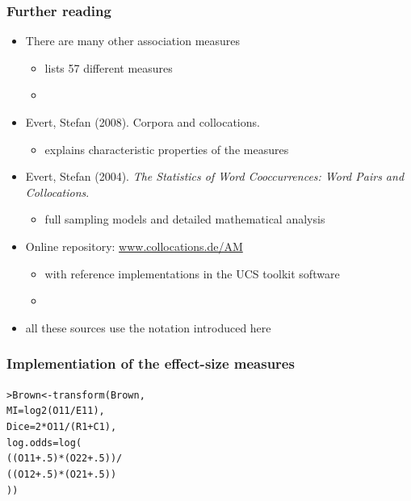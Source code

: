 \documentclass[t]{beamer} %
\begin{document}
\begin{frame}
  \frametitle{Further reading}

  \begin{itemize}
  \item There are many other association measures
    \begin{itemize}
    \item \citet{Pecina:05} lists 57 different measures
    \item[]
    \end{itemize}
  \item Evert, Stefan (2008). Corpora and collocations.\\
    \nocite{Evert:08}
    \begin{itemize}
    \item explains characteristic properties of the measures
    \end{itemize}
  \item Evert, Stefan (2004). \emph{The Statistics of Word Cooccurrences: Word
      Pairs and Collocations}.\\
    \nocite{Evert:04phd}
    \begin{itemize}
    \item full sampling models and detailed mathematical analysis
    \end{itemize}
  \item Online repository: \h{\url{www.collocations.de/AM}}
    \begin{itemize}
    \item with reference implementations in the UCS toolkit software
    \item[]
    \end{itemize}
  \item[\hand] all these sources use the notation introduced here
  \end{itemize}
\end{frame}

\begin{frame}[fragile]
  \frametitle{Implementiation of the effect-size measures}

  \begin{alltt}
\pause
> Brown <- transform(Brown,
  MI = log2(O11/E11),
  Dice = 2 * O11 / (R1 + C1),
  log.odds = log(
    ((O11 + .5) * (O22 + .5)) /
    ((O12 + .5) * (O21 + .5))
  ))

  \end{alltt}
\end{frame}
\end{document}
